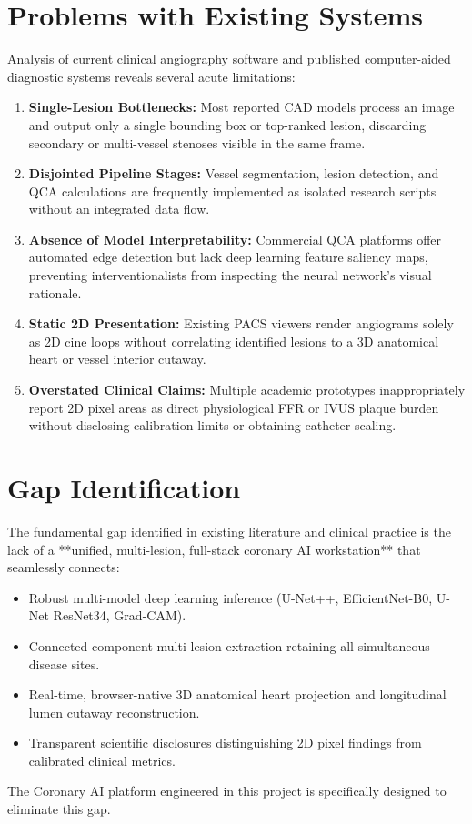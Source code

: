 \section{Problems with Existing Systems}
Analysis of current clinical angiography software and published computer-aided diagnostic systems reveals several acute limitations:
\begin{enumerate}
    \item \textbf{Single-Lesion Bottlenecks:} Most reported CAD models process an image and output only a single bounding box or top-ranked lesion, discarding secondary or multi-vessel stenoses visible in the same frame.
    \item \textbf{Disjointed Pipeline Stages:} Vessel segmentation, lesion detection, and QCA calculations are frequently implemented as isolated research scripts without an integrated data flow.
    \item \textbf{Absence of Model Interpretability:} Commercial QCA platforms offer automated edge detection but lack deep learning feature saliency maps, preventing interventionalists from inspecting the neural network's visual rationale.
    \item \textbf{Static 2D Presentation:} Existing PACS viewers render angiograms solely as 2D cine loops without correlating identified lesions to a 3D anatomical heart or vessel interior cutaway.
    \item \textbf{Overstated Clinical Claims:} Multiple academic prototypes inappropriately report 2D pixel areas as direct physiological FFR or IVUS plaque burden without disclosing calibration limits or obtaining catheter scaling.
\end{enumerate}

\section{Gap Identification}
The fundamental gap identified in existing literature and clinical practice is the lack of a **unified, multi-lesion, full-stack coronary AI workstation** that seamlessly connects:
\begin{itemize}
    \item Robust multi-model deep learning inference (U-Net++, EfficientNet-B0, U-Net ResNet34, Grad-CAM).
    \item Connected-component multi-lesion extraction retaining all simultaneous disease sites.
    \item Real-time, browser-native 3D anatomical heart projection and longitudinal lumen cutaway reconstruction.
    \item Transparent scientific disclosures distinguishing 2D pixel findings from calibrated clinical metrics.
\end{itemize}
The Coronary AI platform engineered in this project is specifically designed to eliminate this gap.
